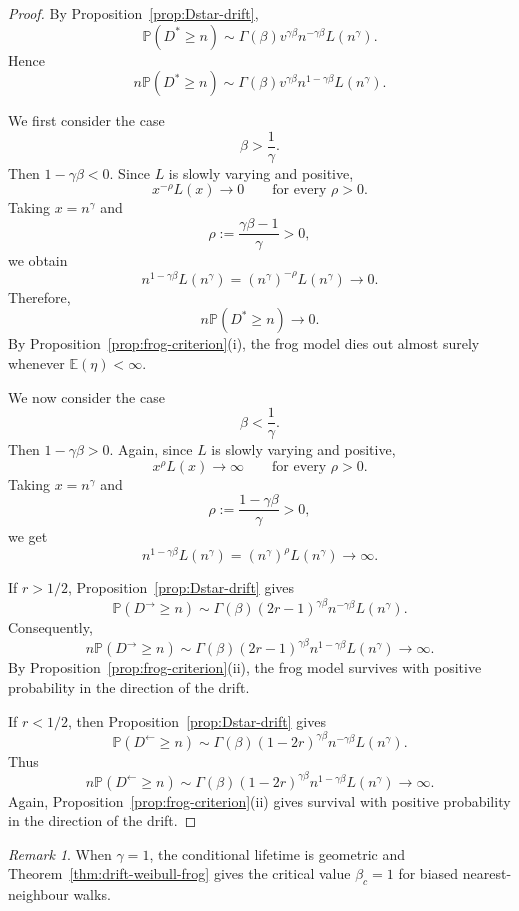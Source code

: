 \documentclass[reqno,final,11pt]{amsart}
\newcommand{\E}{\mathbb E}
\newcommand{\Pbb}{\mathbb P}
\theoremstyle{plain}
\theoremstyle{definition}
\theoremstyle{remark}
\newtheorem{remark}[theorem]{Remark}
\numberwithin{equation}{section}
\begin{document}
\begin{proof}
By Proposition~\ref{prop:Dstar-drift},
\[
  \Pbb(D^*\ge n)
  \sim
  \Gamma(\beta)v^{\gamma\beta}
  n^{-\gamma\beta}L(n^\gamma).
\]
Hence
\[
  n\Pbb(D^*\ge n)
  \sim
  \Gamma(\beta)v^{\gamma\beta}
  n^{1-\gamma\beta}L(n^\gamma).
\]

We first consider the case
\[
  \beta>\frac1\gamma .
\]
Then \(1-\gamma\beta<0\). Since \(L\) is slowly varying and positive,
\[
  x^{-\rho}L(x)\longrightarrow 0
  \qquad\text{for every }\rho>0.
\]
Taking \(x=n^\gamma\) and
\[
  \rho:=\frac{\gamma\beta-1}{\gamma}>0,
\]
we obtain
\[
  n^{1-\gamma\beta}L(n^\gamma)
  =
  (n^\gamma)^{-\rho}L(n^\gamma)
  \longrightarrow 0.
\]
Therefore,
\[
  n\Pbb(D^*\ge n)\longrightarrow0.
\]
By Proposition~\ref{prop:frog-criterion}(i), the frog model dies out almost
surely whenever \(\E(\eta)<\infty\).

We now consider the case
\[
  \beta<\frac1\gamma .
\]
Then \(1-\gamma\beta>0\). Again, since \(L\) is slowly varying and positive,
\[
  x^\rho L(x)\longrightarrow\infty
  \qquad\text{for every }\rho>0.
\]
Taking \(x=n^\gamma\) and
\[
  \rho:=\frac{1-\gamma\beta}{\gamma}>0,
\]
we get
\[
  n^{1-\gamma\beta}L(n^\gamma)
  =
  (n^\gamma)^\rho L(n^\gamma)
  \longrightarrow\infty.
\]

If \(r>1/2\), Proposition~\ref{prop:Dstar-drift} gives
\[
  \Pbb(D^\to\ge n)
  \sim
  \Gamma(\beta)(2r-1)^{\gamma\beta}
  n^{-\gamma\beta}L(n^\gamma).
\]
Consequently,
\[
  n\Pbb(D^\to\ge n)
  \sim
  \Gamma(\beta)(2r-1)^{\gamma\beta}
  n^{1-\gamma\beta}L(n^\gamma)
  \longrightarrow\infty.
\]
By Proposition~\ref{prop:frog-criterion}(ii), the frog model survives with
positive probability in the direction of the drift.

If \(r<1/2\), then Proposition~\ref{prop:Dstar-drift} gives
\[
  \Pbb(D^\leftarrow\ge n)
  \sim
  \Gamma(\beta)(1-2r)^{\gamma\beta}
  n^{-\gamma\beta}L(n^\gamma).
\]
Thus
\[
  n\Pbb(D^\leftarrow\ge n)
  \sim
  \Gamma(\beta)(1-2r)^{\gamma\beta}
  n^{1-\gamma\beta}L(n^\gamma)
  \longrightarrow\infty.
\]
Again, Proposition~\ref{prop:frog-criterion}(ii) gives survival with positive
probability in the direction of the drift.
\end{proof}







\begin{remark}
When \(\gamma=1\), the conditional lifetime is geometric and Theorem~\ref{thm:drift-weibull-frog}
gives the critical value \(\beta_c=1\) for biased nearest-neighbour walks.
\end{remark}
\end{document}
